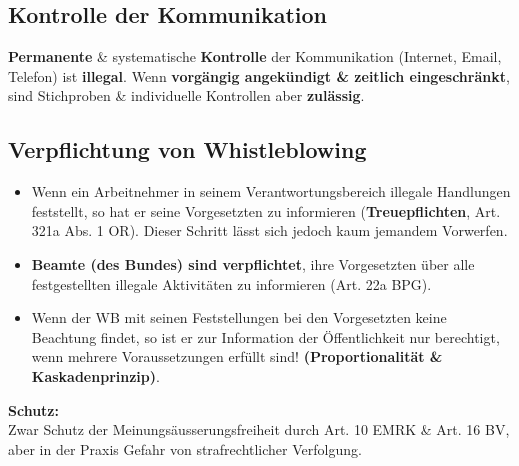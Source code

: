 \hypertarget{kontrolle-der-kommunikation}{%
\subsection{Kontrolle der
Kommunikation}\label{kontrolle-der-kommunikation}}

\textbf{Permanente} \& systematische \textbf{Kontrolle} der
Kommunikation (Internet, Email, Telefon) ist \textbf{illegal}. Wenn
\textbf{vorgängig angekündigt \& zeitlich eingeschränkt}, sind
Stichproben \& individuelle Kontrollen aber \textbf{zulässig}.

\hypertarget{verpflichtung-von-whistleblowing}{%
\subsection{Verpflichtung von
Whistleblowing}\label{verpflichtung-von-whistleblowing}}

\begin{itemize}
\tightlist
\item
  Wenn ein Arbeitnehmer in seinem Verantwortungsbereich illegale
  Handlungen feststellt, so hat er seine Vorgesetzten zu informieren
  (\textbf{Treuepflichten}, Art. 321a Abs. 1 OR). Dieser Schritt lässt
  sich jedoch kaum jemandem Vorwerfen.
\item
  \textbf{Beamte (des Bundes) sind verpflichtet}, ihre Vorgesetzten über
  alle festgestellten illegale Aktivitäten zu informieren (Art. 22a
  BPG).
\item
  Wenn der WB mit seinen Feststellungen bei den Vorgesetzten keine
  Beachtung findet, so ist er zur Information der Öffentlichkeit nur
  berechtigt, wenn mehrere Voraussetzungen erfüllt sind!
  \textbf{(Proportionalität \& Kaskadenprinzip)}.
\end{itemize}

\textbf{Schutz:}\\
Zwar Schutz der Meinungsäusserungsfreiheit durch Art. 10 EMRK \& Art. 16
BV, aber in der Praxis Gefahr von strafrechtlicher Verfolgung.
